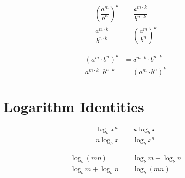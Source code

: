 \documentclass[20150903-160354-rs2.2-MarksMathNotebook.tex]{subfiles}
\begin{document}
\begin{arule}
\begin{subequations}
\begin{align}
	\left(\dfrac{a^m}{b^n}\right)^k &= \dfrac{a^{m \cdot k}}{b^{n\cdot k}} \label{eq:poqpo1}\\
	\dfrac{a^{m \cdot k}}{b^{n\cdot k}} &= \left(\dfrac{a^m}{b^n}\right)^k \label{eq:poqpo2}
\end{align}
\end{subequations}
\end{arule}

\begin{arule}
\begin{subequations}
\begin{align}
	\left(a^m \cdot b^n\right)^k &= a^{m \cdot k} \cdot b^{n\cdot k} \label{eq:poprpo1}\\
	a^{m \cdot k} \cdot b^{n \cdot k} &= \left(a^m \cdot b^n\right)^k \label{eq:poprpo2}
\end{align}
\end{subequations}
\end{arule}


\section{Logarithm Identities}

\begin{arule}
\begin{subequations}
\begin{align}
	\log_b x^n &= n \log_b x \label{eq:lpopo1}\\
	n \log_b x &= \log_b x^n \label{eq:lpopo2}
\end{align}
\end{subequations}
\end{arule}

\begin{arule}
\begin{subequations}
\begin{align}
	\log_b (mn) &= \log_b m + \log_b n \label{eq:lprcbpo1}\\
	\log_b m + \log_b n &= \log_b (mn) \label{eq:lprcbpo2}
\end{align}
\end{subequations}
\end{arule}
\end{document}
